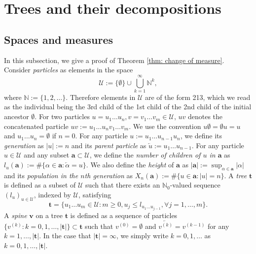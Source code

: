\documentclass[12pt,a4paper]{amsart}
\numberwithin{equation}{section}
\begin{document}
\section{Trees and their decompositions}
\label{sec:preliminary}
\subsection{Spaces and measures}
\label{sec:spacesandmeasures}
	In this subsection, we give a proof of Theorem \ref{thm: change of measure}.
 	Consider \emph{particles} as elements in the space
\[
		\mathcal U
	:=
	\{\emptyset\}\cup\bigcup_{k=1}^\infty \mathbb N^k,
\]
	where $\mathbb N:=\{1,2,\dots\}$.
	Therefore elements in $\mathcal U$ are of the form 213, which we read as the individual being the 3rd child of the 1st child of the 2nd child of the initial ancestor $\emptyset$.
	For two particles $u=u_1\dots u_n, v=v_1\dots v_m\in\mathcal U$, $uv$ denotes the concatenated particle $uv:=u_1\dots u_nv_1\dots v_m$.
	We use the convention $u\emptyset = \emptyset u = u$ and $u_1\dots u_n=\emptyset$ if $n=0$.
	For any particle $u:=u_1\dots u_{n-1}u_n$, we define its \emph{generation} as $| u |:=n$ and its \emph{parent particle} as $\overleftarrow{u}:=u_1\dots u_{n-1}$.
	For any particle $u \in \mathcal U$ and any subset $\mathbf a \subset \mathcal U$, we define the \emph{number of children of $u$ in $\mathbf a$} as $l_u(\mathbf a) := \#\{\alpha\in \mathbf a:\overleftarrow{\alpha}=u\} $.
	We also define the \emph{height} of $\mathbf a$ as $|\mathbf a|:=\sup_{\alpha\in \mathbf a}|\alpha|$ and its \emph{population in the $n$th generation} as $X_n(\mathbf a):=\#\{u\in \mathbf a:|u|=n\}$.
	A \emph{tree} $ \mathbf t $ is defined as a subset of $\mathcal U$ such that there exists an $\mathbb N_0$-valued sequence $(l_u)_{u\in \mathcal U}$,
	indexed by $\mathcal U$, satisfying
\[
		 \mathbf t
	=\{u_1\dots u_m\in \mathcal U: m\ge 0, u_j\leq l_{u_1\dots u_{j-1}}, \forall  j=1,\dots,m\}.
\]
	A \emph{spine} $ \mathbf v$ on a  tree $ \mathbf t $ is defined as a sequence of particles $\{v^{(k)}:k=0,1,\dots,| \mathbf t |\}\subset \mathbf t $ such that $v^{(0)}=\emptyset$ and $\overleftarrow{v^{(k)}}=v^{(k-1)}$ for any $k=1,\dots, | \mathbf t |$.
	In the case that $| \mathbf t |=\infty$, we simply write $k=0,1,\dots$ as $k=0,1,\dots, | \mathbf t |$.
\end{document}
